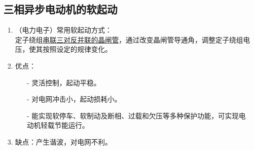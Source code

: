 \documentclass[blue]{elegantnote}
\begin{document}
\subsection{三相异步电动机的软起动}
\begin{enumerate}
	\item （电力电子）常用软起动方式：\\
	定子绕组\underline{串联三对反并联的晶闸管}，通过改变晶闸管导通角，调整定子绕组电压，使其按照设定的规律变化。
	\item 优点：
	\begin{itemize}
		\item[-] 灵活控制，起动平稳。
		\item[-] 对电网冲击小，起动损耗小。
		\item[-] 能实现软停车、软制动及断相、过载和欠压等多种保护功能，可实现电动机轻载节能运行。
	\end{itemize}
	\item 缺点：产生谐波，对电网不利。
\end{enumerate}
\end{document}
